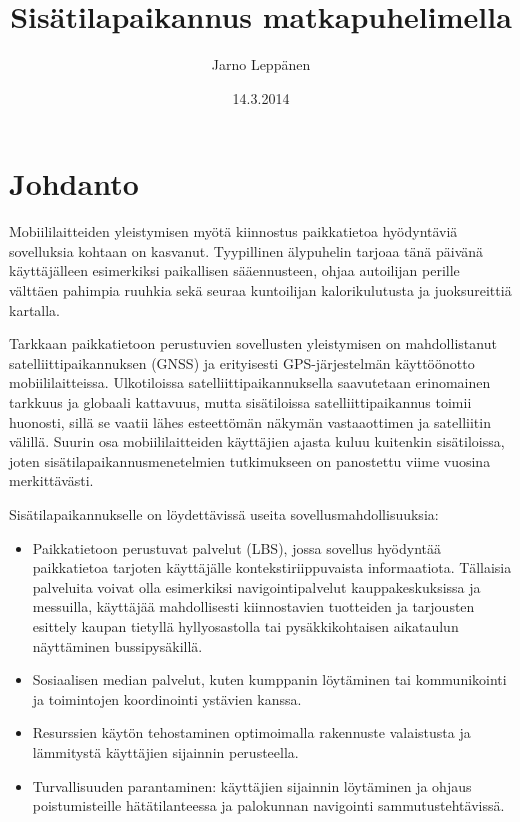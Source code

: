 \documentclass[a4paper,parskip=half]{scrartcl}
\author{Jarno Leppänen}
\title{Sisätilapaikannus matkapuhelimella}
\date{14.3.2014}
\begin{document}
\maketitle


\section{Johdanto}

Mobiililaitteiden yleistymisen myötä kiinnostus paikkatietoa hyödyntäviä
sovelluksia kohtaan on kasvanut\cite{harle2013survey}. Tyypillinen älypuhelin
tarjoaa tänä päivänä käyttäjälleen esimerkiksi paikallisen sääennusteen, ohjaa
autoilijan perille välttäen pahimpia ruuhkia sekä seuraa kuntoilijan
kalorikulutusta ja juoksureittiä kartalla.

Tarkkaan paikkatietoon perustuvien sovellusten yleistymisen on mahdollistanut
satelliittipaikannuksen (\acrshort{GNSS}) ja erityisesti
\acrshort{GPS}-järjestelmän käyttöönotto mobiililaitteissa. Ulkotiloissa
satelliittipaikannuksella saavutetaan erinomainen tarkkuus ja globaali
kattavuus, mutta sisätiloissa satelliittipaikannus toimii huonosti, sillä se
vaatii lähes esteettömän näkymän vastaaottimen ja satelliitin välillä. Suurin
osa mobiililaitteiden käyttäjien ajasta kuluu kuitenkin sisätiloissa, joten
sisätilapaikannusmenetelmien tutkimukseen on panostettu viime vuosina
merkittävästi.

Sisätilapaikannukselle on löydettävissä useita
sovellusmahdollisuuksia\cite{mautz2012indoor}:
\begin{itemize}
  \item Paikkatietoon perustuvat palvelut (\acrshort{LBS}), jossa sovellus
    hyödyntää paikkatietoa tarjoten käyttäjälle kontekstiriippuvaista
    informaatiota. Tällaisia palveluita voivat olla esimerkiksi
    navigointipalvelut kauppakeskuksissa ja messuilla,
    käyttäjää mahdollisesti kiinnostavien tuotteiden ja tarjousten esittely
    kaupan tietyllä hyllyosastolla tai pysäkkikohtaisen aikataulun näyttäminen
    bussipysäkillä.
  \item Sosiaalisen median palvelut, kuten kumppanin löytäminen tai
    kommunikointi ja toimintojen koordinointi ystävien kanssa.
  \item Resurssien käytön tehostaminen optimoimalla rakennuste valaistusta ja
    lämmitystä käyttäjien sijainnin perusteella.
  \item Turvallisuuden parantaminen: käyttäjien sijainnin löytäminen
    ja ohjaus poistumisteille hätätilanteessa ja palokunnan navigointi
    sammutustehtävissä.
\end{itemize}
\end{document}

